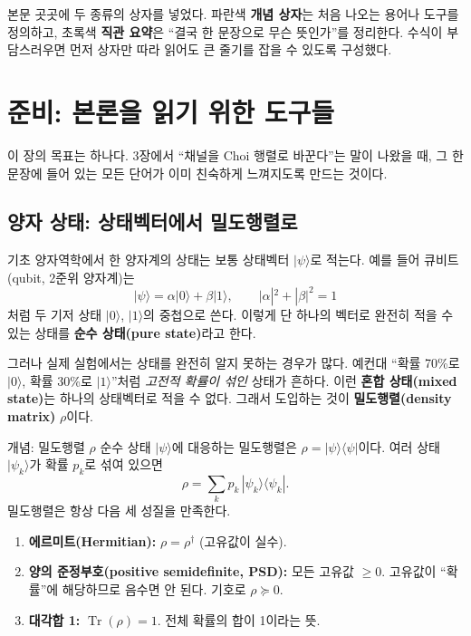 \documentclass[11pt,a4paper]{article}
\newcommand{\Tr}{\operatorname{Tr}}
\begin{document}
본문 곳곳에 두 종류의 상자를 넣었다. 파란색 \textbf{개념 상자}는 처음 나오는 용어나 도구를 정의하고, 초록색 \textbf{직관 요약}은 ``결국 한 문장으로 무슨 뜻인가''를 정리한다. 수식이 부담스러우면 먼저 상자만 따라 읽어도 큰 줄기를 잡을 수 있도록 구성했다.

\section{준비: 본론을 읽기 위한 도구들}

이 장의 목표는 하나다. 3장에서 ``채널을 Choi 행렬로 바꾼다''는 말이 나왔을 때, 그 한 문장에 들어 있는 모든 단어가 이미 친숙하게 느껴지도록 만드는 것이다.

\subsection{양자 상태: 상태벡터에서 밀도행렬로}

기초 양자역학에서 한 양자계의 상태는 보통 상태벡터 $|\psi\rangle$로 적는다. 예를 들어 큐비트(qubit, 2준위 양자계)는
\[
|\psi\rangle = \alpha|0\rangle + \beta|1\rangle, \qquad |\alpha|^2+|\beta|^2=1
\]
처럼 두 기저 상태 $|0\rangle$, $|1\rangle$의 중첩으로 쓴다. 이렇게 단 하나의 벡터로 완전히 적을 수 있는 상태를 \textbf{순수 상태(pure state)}라고 한다.

그러나 실제 실험에서는 상태를 완전히 알지 못하는 경우가 많다. 예컨대 ``확률 70\%로 $|0\rangle$, 확률 30\%로 $|1\rangle$''처럼 \emph{고전적 확률이 섞인} 상태가 흔하다. 이런 \textbf{혼합 상태(mixed state)}는 하나의 상태벡터로 적을 수 없다. 그래서 도입하는 것이 \textbf{밀도행렬(density matrix)} $\rho$이다.

\begin{conceptbox}{개념: 밀도행렬 $\rho$}
순수 상태 $|\psi\rangle$에 대응하는 밀도행렬은 $\rho = |\psi\rangle\langle\psi|$이다.
여러 상태 $|\psi_k\rangle$가 확률 $p_k$로 섞여 있으면
\[
\rho = \sum_k p_k\,|\psi_k\rangle\langle\psi_k|.
\]
밀도행렬은 항상 다음 세 성질을 만족한다.
\begin{enumerate}
  \item \textbf{에르미트(Hermitian):} $\rho=\rho^\dagger$ (고유값이 실수).
  \item \textbf{양의 준정부호(positive semidefinite, PSD):} 모든 고유값 $\ge 0$. 고유값이 ``확률''에 해당하므로 음수면 안 된다. 기호로 $\rho\succeq 0$.
  \item \textbf{대각합 1:} $\Tr(\rho)=1$. 전체 확률의 합이 1이라는 뜻.
\end{enumerate}
\end{conceptbox}
\end{document}
